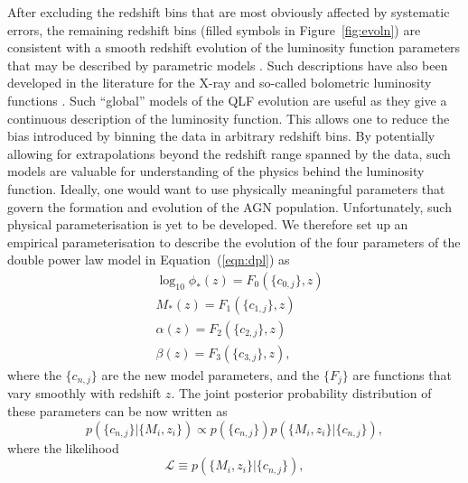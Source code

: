 \documentclass[fleqn,usenatbib]{mnras}
\begin{document}
After excluding the redshift bins that are most obviously affected by
systematic errors, the remaining redshift bins (filled symbols in
Figure~\ref{fig:evoln}) are consistent with a smooth redshift
evolution of the luminosity function parameters that may be described
by parametric models \citep{1976A&A....53...15M, 1983ApJ...269..352S,
  1988ApJ...325...92K, 1988MNRAS.235..935B, 1993ApJ...406L..43H,
  1994ApJ...421..412W, 1995AJ....110...68S, 1995AJ....110.2553K,
  1995ApJ...438..623P, 2000MNRAS.317.1014B, 2001AJ....121...54F,
  2006AJ....131.2766R, 2007A&A...472..443B, 2009MNRAS.399.1755C,
  2013ApJ...773...14R, 2013A&A...551A..29P}.  Such descriptions have
also been developed in the literature for the X-ray
\citep[e.g.,][]{2015MNRAS.451.1892A} and so-called bolometric
luminosity functions \citep[e.g.,][]{2007ApJ...654..731H}.  Such
``global'' models of the QLF evolution are useful as
they give a continuous description of the luminosity function.  This
allows one to reduce the bias introduced by binning the data in
arbitrary redshift bins.  By potentially allowing for extrapolations
beyond the redshift range spanned by the data, such models are
valuable for understanding of the physics behind the luminosity
function.  Ideally, one would want to use physically meaningful
parameters that govern the formation and evolution of the AGN
population.  Unfortunately, such physical parameterisation is yet to
be developed.  We therefore set up an empirical parameterisation to
describe the evolution of the four parameters of the double power law
model in Equation~(\ref{eqn:dpl}) as 
\begin{align}
  &\log_{10}\phi_*(z) = F_0(\{c_{0,j}\}, z)\nonumber\\
  &M_*(z) = F_1(\{c_{1,j}\}, z)\nonumber\\
  &\alpha(z) = F_2(\{c_{2,j}\}, z)\nonumber\\
  &\beta(z) = F_3(\{c_{3,j}\}, z),
  \label{eqn:global}
\end{align}
where the $\{c_{n,j}\}$ are the new model parameters, and the $\{F_j\}$
are functions that vary smoothly with redshift $z$.  The joint
posterior probability distribution of these parameters can be now
written as
\begin{equation}
  p(\{c_{n,j}\} | \{M_i, z_i\}) \propto p(\{c_{n,j}\})p(\{M_i, z_i\} | \{c_{n,j}\}),
\end{equation}
where the likelihood 
\begin{equation}
  \mathcal{L}\equiv p(\{M_i, z_i\} | \{c_{n,j}\}),
\end{equation}
\end{document}
